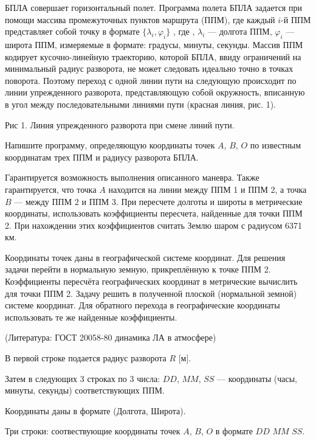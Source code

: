
БПЛА совершает горизонтальный полет. Программа полета БПЛА задается при
помощи массива промежуточных пунктов маршрута (ППМ), где каждый  $i$-й ППМ
представляет собой точку в формате $\{\lambda_i, \varphi_i\}$ , где , $\lambda_i$  — долгота ППМ, 
$\varphi_i$   — широта ППМ, измеряемые в формате: градусы, минуты, секунды.
Массив ППМ кодирует кусочно-линейную траекторию, которой БПЛА, ввиду
ограничений на минимальный радиус разворота, не может следовать идеально точно
в точках поворота. Поэтому переход с одной линии пути на следующую происходит
по линии упрежденного разворота, представляющую собой окружность, вписанную в
угол между последовательными линиями пути (красная линия, рис. 1).


Рис 1. Линия упрежденного
разворота при смене линий пути.

Напишите программу, определяющую координаты точек  $A$, $B$, $O$  по известным координатам трех ППМ и
радиусу разворота БПЛА.

Гарантируется возможность выполнения описанного
маневра. Также гарантируется, что точка  $A$  находится на линии между ППМ 1 и ППМ
2, а точка $B$  — между ППМ 2 и ППМ 3. При пересчете долготы и широты в
метрические координаты, использовать коэффициенты пересчета, найденные для точки
ППМ 2. При нахождении этих коэффициентов считать Землю шаром с радиусом 6371 
км.

Координаты точек даны в географической системе координат. Для решения 
задачи перейти в нормальную земную, прикреплённую к точке ППМ 2. 
Коэффициенты пересчёта географических координат в метрические вычислить для точки ППМ 2. 
Задачу решить в полученной плоской (нормальной земной) системе координат. Для обратного 
перехода в географические координаты использовать те же найденные коэффициенты.

(Литература: ГОСТ 20058-80 динамика ЛА в атмосфере)


В первой строке подается радиус разворота $R$  [м].

Затем в следующих 3 строках по 3 числа:  $DD$, $MM$, $SS$  — координаты (часы, минуты, секунды) 
соответствующих ППМ.

Координаты даны в формате (Долгота, Широта).

\outputfmtSection

Три строки: соотвествующие координаты точек $A$, $B$, $O$  в формате $DD$ $MM$ $SS$.

